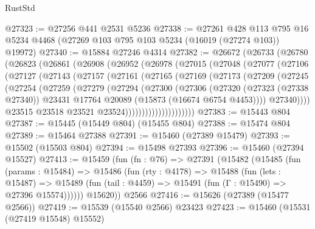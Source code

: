 \begin{lexlean}{RustStd}
\begin{coremodule}
@27323 := @27256 @441 @2531 @5236
@27338 := @27261
    @428
    @113
    @795
    @16
    @5234
    @4468
    (@27269 @103 @795 @103 @5234 (@16019 (@27274 @103)) @19972)
@27340 := @15884 @27246 @4314
@27382 := @26672
    (@26733
      (@26780
        (@26823
          (@26861
            (@26908
              (@26952
                (@26978
                  (@27015
                    (@27048
                      (@27077
                        (@27106
                          (@27127
                            (@27143
                              (@27157
                                (@27161
                                  (@27165
                                    (@27169
                                      (@27173
                                        (@27209
                                          (@27245
                                            (@27254
                                              (@27259
                                                (@27279
                                                  (@27294
                                                    (@27300
                                                      (@27306
                                                        (@27320
                                                          (@27323 (@27338 @27340))
                                                          @23431
                                                          @17764
                                                          @20089
                                                          (@15873 (@16674 @6754 @4453))))
                                                      @27340))))
                                              @23515
                                              @23518
                                              @23521
                                              @23524)))))))))))))))))))))
@27383 := @15443 @804
@27387 := @15445 (@15449 @804) (@15455 @804)
@27388 := @15474 @804
@27389 := @15464 @27388
@27391 := @15460 (@27389 @15479)
@27393 := @15502 (@15503 @804)
@27394 := @15498 @27393
@27396 := @15460 (@27394 @15527)
@27413 := @15459
    (fun (fn : @76) =>
    @27391
      (@15482
        (@15485
          (fun (params : @15484) =>
          @15486
            (fun (rty : @4178) =>
            @15488
              (fun (lets : @15487) =>
              @15489 (fun (tail : @4459) => @15491 (fun (Γ : @15490) => @27396 @15574))))))
        @15620))
    @2566
@27416 := @15626 (@27389 (@15477 @2566))
@27419 := @15539 (@15540 @2566) @23423
@27423 := @15460 (@15531 (@27419 @15548) @15552)

\end{coremodule}
\end{lexlean}
